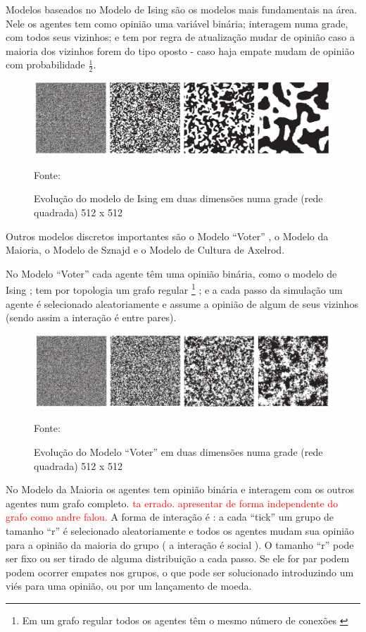 \quad \quad Modelos baseados no Modelo de Ising são os modelos mais fundamentais na
área. Nele os agentes tem como opinião uma variável binária; interagem numa
grade, com todos seus vizinhos; e tem por regra de atualização mudar de opinião
caso a maioria dos vizinhos forem do tipo oposto - caso haja empate mudam de
opinião com probabilidade $\frac{1}{2}$. 


\begin{figure}[H]
  \centering \includegraphics[scale = 0.5]{ims/ising.png}
  \caption{Evolução do modelo de Ising em duas dimensões numa grade (rede quadrada)
    512 x 512}
  Fonte: 
\end{figure}


Outros modelos discretos importantes são o Modelo ``Voter'' , o Modelo da
Maioria, o Modelo de Sznajd e o Modelo de Cultura de Axelrod.

No Modelo ``Voter'' cada agente têm uma opinião binária, como o modelo
de Ising ; tem por topologia um grafo regular \footnote{Em um grafo
  regular todos os agentes têm o mesmo número de conexões \cite{sayama2015introduction}} ; e a cada
passo da simulação um agente é selecionado aleatoriamente e assume a
opinião de algum de seus vizinhos (sendo assim a interação é entre
pares).

\begin{figure}[H]
  \centering \includegraphics[scale = 0.5]{ims/voter.png}
  \caption{Evolução do Modelo ``Voter'' em duas dimensões numa grade (rede quadrada)
    512 x 512}
  Fonte: 
\end{figure}



No Modelo da Maioria os agentes tem opinião binária e interagem com os outros
agentes num grafo completo. \textcolor{red}{ta errado. apresentar de forma
  independente do grafo como andre falou.} A forma de interação é : a cada
``tick'' um grupo de tamanho ``r'' é selecionado aleatoriamente e todos os
agentes mudam sua opinião para a opinião da maioria do grupo ( a interação é
social ). O tamanho ``r'' pode ser fixo ou ser tirado de alguma distribuição a
cada passo. Se ele for par podem podem ocorrer empates nos grupos, o que pode
ser solucionado introduzindo um viés para uma opinião, ou por um lançamento de
moeda.

